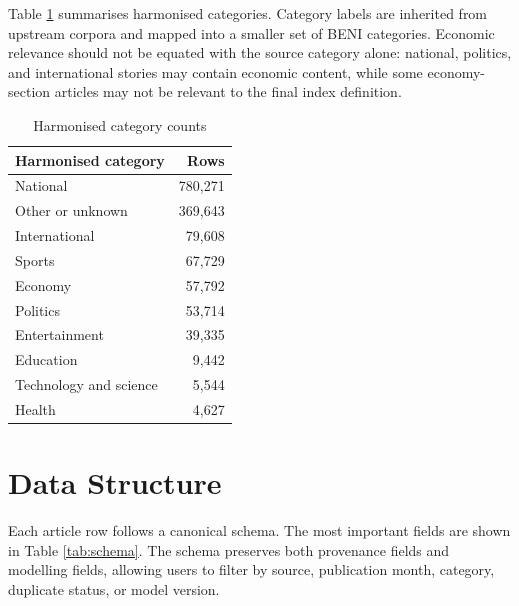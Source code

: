 \documentclass[11pt]{article}
\begin{document}
Table \ref{tab:category-coverage} summarises harmonised categories. Category labels are inherited from upstream corpora and mapped into a smaller set of BENI categories. Economic relevance should not be equated with the source category alone: national, politics, and international stories may contain economic content, while some economy-section articles may not be relevant to the final index definition.

\begin{table}[htbp]
\centering
\caption{Harmonised category counts}
\label{tab:category-coverage}
\begin{tabular}{lr}
\toprule
Harmonised category & Rows\\
\midrule
National & 780,271\\
Other or unknown & 369,643\\
International & 79,608\\
Sports & 67,729\\
Economy & 57,792\\
Politics & 53,714\\
Entertainment & 39,335\\
Education & 9,442\\
Technology and science & 5,544\\
Health & 4,627\\
\bottomrule
\end{tabular}
\end{table}

\section{Data Structure}

Each article row follows a canonical schema. The most important fields are shown in Table \ref{tab:schema}. The schema preserves both provenance fields and modelling fields, allowing users to filter by source, publication month, category, duplicate status, or model version.
\end{document}
